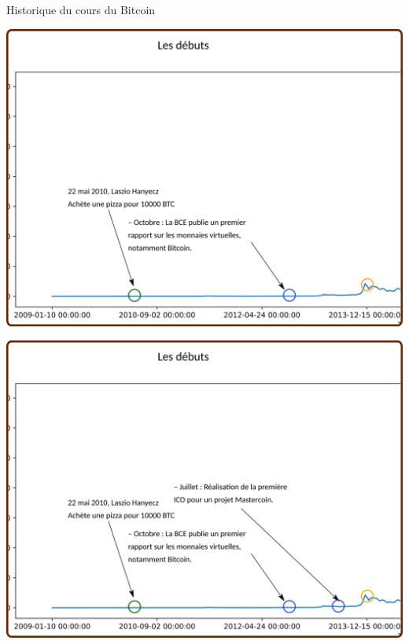 \documentclass[presentation]{beamer}
\begin{document}
\begin{frame}[label={sec:org6ff9387}]{Historique du cours du Bitcoin}
\begin{block}{}
\begin{center}
\includegraphics[width=.95\textwidth]{./Pictures/Timeline/10debut_BCE.png}
\end{center}
\end{block}

\begin{block}{}
\begin{center}
\includegraphics[width=.95\textwidth]{./Pictures/Timeline/11debut_ICO.png}
\end{center}
\end{block}


\end{frame}
\end{document}
